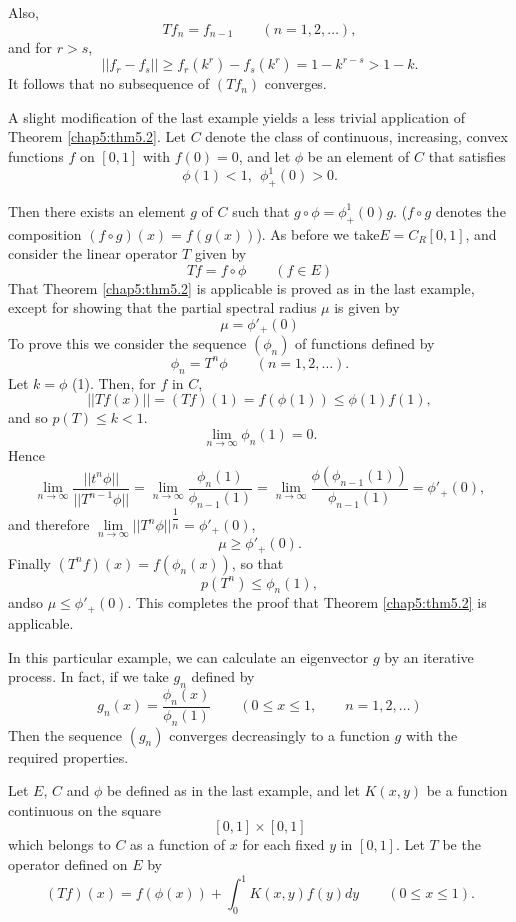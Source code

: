  Also,
 $$
 Tf_n = f_{n-1} \qquad (n = 1, 2, \ldots), 
 $$
 and for $r > s$,
 $$
 || f_r - f_s || \geq f_r (k^r) - f_s (k^r) = 1 - k^{r-s} > 1 -k .
 $$
 It follows that no subsequence of $(Tf_n)$ converges.
 
 \begin{exam}%
   A slight modification of the last example yields a less trivial
   application of Theorem \ref{chap5:thm5.2}. Let $C$ denote the class
   of continuous, increasing, convex functions $f$ on $[0, 1]$ with
   $f(0) = 0$, and let $\phi$ be an element of $C$ that satisfies 
   $$
   \phi (1) < 1, ~  ~ \phi^1_+ (0) > 0.
   $$
 \end{exam} 
 
 Then there exists an element $g$ of $C$ such that $g \circ \phi =
 \phi^1_+ (0) g$. ($f \circ g$ denotes the composition $(f \circ g) (x) =
 f(g(x))$). As before we take\pageoriginale $E = C_R [0 , 1]$, and
 consider the linear operator $T$ given by   
 $$
 Tf = f \circ \phi \qquad (f \in E)
 $$
 That Theorem \ref{chap5:thm5.2} is applicable is proved as in the
 last example, except for showing that the partial spectral radius
 $\mu$ is given by   
 $$
 \mu = \phi'_+ (0)
 $$
 To prove this we consider the sequence $(\phi_n)$ of functions
 defined by  
 $$
 \phi_n = T^n \phi \qquad (n = 1, 2, \ldots).
 $$
 Let $k = \phi$ (1). Then, for $f$ in $C$,
 $$
 || Tf (x)|| = (Tf) (1) = f (\phi (1)) \leq \phi (1) f(1), 
 $$
 and so $p(T) \leq k < 1$.
 $$
 \lim_{n \to \infty} \phi_n (1) = 0.
 $$
 Hence
 $$
 \lim_{n \to \infty} \frac{|| t^n \phi ||} {|| T^{n-1} \phi ||}=
 \lim_{n \to \infty} \frac{\phi_n(1)}{\phi_{n-1} (1)} = \lim_{n \to
   \infty} \frac{\phi(\phi_{n-1}(1))}{\phi_{n-1} (1)} = \phi'_+ (0),  
 $$
 and therefore $\lim\limits_{n \to \infty} || T^n \phi ||
 ^{\dfrac{1}{n}} = \phi'_+ (0)$, 
 $$
 \mu \geq \phi'_+ (0).
 $$
 Finally $(T^nf) (x) = f (\phi_n (x))$, so that
 $$
 p(T^n) \leq \phi_n (1),
 $$
 and\pageoriginale so $\mu \leq \phi'_+ (0)$. This completes the proof
 that Theorem \ref{chap5:thm5.2} is applicable. 
 
 In this particular example, we can calculate an eigenvector $g$ by an
 iterative process. In fact, if we take $g_n$ defined by 
 $$
 g_n (x) = \frac{\phi_n(x)}{\phi_{n} (1)} \qquad (0 \leq x \leq 1 ,
 \qquad n =1, 2, \ldots) 
 $$
 Then the sequence $(g_n)$ converges decreasingly to a function $g$
 with the required properties. 
 
\begin{exam}\label{chap5:exam3} %
  Let $E$, $C$ and $\phi$ be defined as in the last example, and let
  $K(x, y)$ be a function continuous on the square 
  $$
  [0 , 1] \times [0 , 1]
  $$
  which belongs to $C$ as a function of $x$ for each fixed $y$ in $[0
    , 1]$. Let $T$ be the operator defined on $E$ by 
  $$
  (Tf) (x) = f(\phi (x)) + \int^1_0 K(x, y) f(y) dy \qquad (0 \leq x \leq 1).
  $$
\end{exam} 

